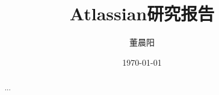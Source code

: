 \documentclass[a4paper,12pt]{ctexart}
\title{Atlassian研究报告}
\author{董晨阳}
\date{\today}
\begin{document}
\maketitle
\begin{abstract}
    ...
\end{abstract}
\clearpage





\end{document}
